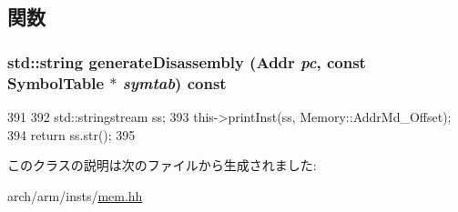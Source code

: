 \subsection{関数}
\hypertarget{classArmISA_1_1MemoryOffset_a95d323a22a5f07e14d6b4c9385a91896}{
\subsubsection[{generateDisassembly}]{\setlength{\rightskip}{0pt plus 5cm}std::string generateDisassembly ({\bf Addr} {\em pc}, \/  const SymbolTable $\ast$ {\em symtab}) const}}
\label{classArmISA_1_1MemoryOffset_a95d323a22a5f07e14d6b4c9385a91896}



\begin{DoxyCode}
391     {
392         std::stringstream ss;
393         this->printInst(ss, Memory::AddrMd_Offset);
394         return ss.str();
395     }
\end{DoxyCode}


このクラスの説明は次のファイルから生成されました:\begin{DoxyCompactItemize}
\item 
arch/arm/insts/\hyperlink{arm_2insts_2mem_8hh}{mem.hh}\end{DoxyCompactItemize}
